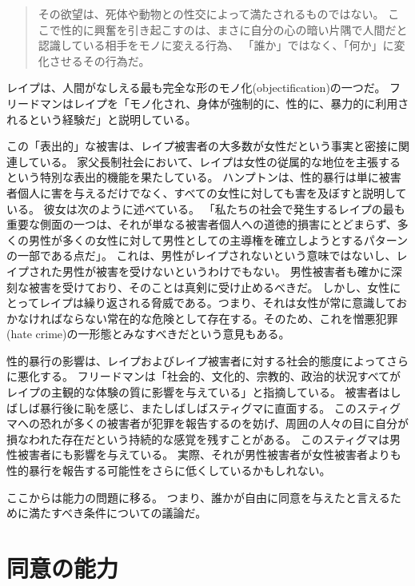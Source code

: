 \documentclass[paper=a4,book,openany]{jlreq} \usepackage{mystyle}
\begin{document}
\begin{quote}
その欲望は、死体や動物との性交によって満たされるものではない。
ここで性的に興奮を引き起こすのは、まさに自分の心の暗い片隅で人間だと認識している相手をモノに変える行為、
「誰か」ではなく、「何か」に変化させるその行為だ。
\citep[p.281]{nussbaum95:_objec}
\end{quote}

レイプは、人間がなしえる最も完全な形のモノ化(objectification)の一つだ。
フリードマンはレイプを「モノ化され、身体が強制的に、性的に、暴力的に利用されるという経験だ」と説明している。

この「表出的」な被害は、レイプ被害者の大多数が女性だという事実と密接に関連している。
家父長制社会において、レイプは女性の従属的な地位を主張するという特別な表出的機能を果たしている。
ハンプトンは、性的暴行は単に被害者個人に害を与えるだけでなく、すべての女性に対しても害を及ぼすと説明している。
彼女は次のように述べている。
「私たちの社会で発生するレイプの最も重要な側面の一つは、それが単なる被害者個人への道徳的損害にとどまらず、多くの男性が多くの女性に対して男性としての主導権を確立しようとするパターンの一部である点だ」\citep[p.135]{hampton99:_defin_wrong_and_defin_rape}。
これは、男性がレイプされないという意味ではないし、レイプされた男性が被害を受けないというわけでもない。
男性被害者も確かに深刻な被害を受けており、そのことは真剣に受け止めるべきだ。
しかし、女性にとってレイプは繰り返される脅威である。つまり、それは女性が常に意識しておかなければならない常在的な危険として存在する。そのため、これを憎悪犯罪(hate crime)の一形態とみなすべきだという意見もある\citep{campo-engelstein16:_rape_hate_crime}。

性的暴行の影響は、レイプおよびレイプ被害者に対する社会的態度によってさらに悪化する。
フリードマンは「社会的、文化的、宗教的、政治的状況すべてがレイプの主観的な体験の質に影響を与えている」と指摘している。
被害者はしばしば暴行後に恥を感じ、またしばしばスティグマに直面する。
このスティグマへの恐れが多くの被害者が犯罪を報告するのを妨げ、周囲の人々の目に自分が損なわれた存在だという持続的な感覚を残すことがある。
このスティグマは男性被害者にも影響を与えている。
実際、それが男性被害者が女性被害者よりも性的暴行を報告する可能性をさらに低くしているかもしれない\citep{mezey87:_male_victim_sexual_assaul}。

ここからは能力の問題に移る。
つまり、誰かが自由に同意を与えたと言えるために満たすべき条件についての議論だ。

\section{同意の能力}
\end{document}
